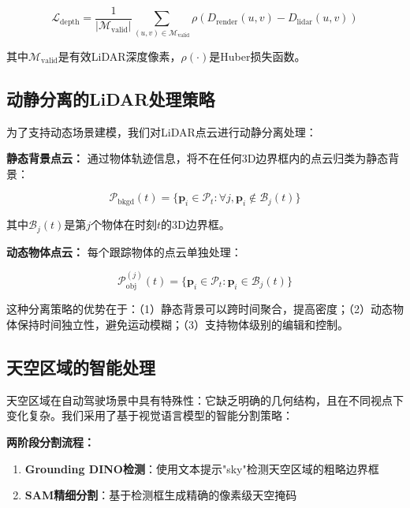 \begin{equation}
\mathcal{L}_{\text{depth}} = \frac{1}{|\mathcal{M}_{\text{valid}}|} \sum_{(u,v) \in \mathcal{M}_{\text{valid}}} \rho(D_{\text{render}}(u,v) - D_{\text{lidar}}(u,v))
\label{eq:depth_supervision}
\end{equation}

其中$\mathcal{M}_{\text{valid}}$是有效LiDAR深度像素，$\rho(\cdot)$是Huber损失函数。

\subsection{动静分离的LiDAR处理策略}

为了支持动态场景建模，我们对LiDAR点云进行动静分离处理：

\textbf{静态背景点云：}
通过物体轨迹信息，将不在任何3D边界框内的点云归类为静态背景：

\begin{equation}
\mathcal{P}_{\text{bkgd}}(t) = \{\mathbf{p}_i \in \mathcal{P}_t : \forall j, \mathbf{p}_i \notin \mathcal{B}_j(t)\}
\label{eq:background_points}
\end{equation}

其中$\mathcal{B}_j(t)$是第$j$个物体在时刻$t$的3D边界框。

\textbf{动态物体点云：}
每个跟踪物体的点云单独处理：

\begin{equation}
\mathcal{P}_{\text{obj}}^{(j)}(t) = \{\mathbf{p}_i \in \mathcal{P}_t : \mathbf{p}_i \in \mathcal{B}_j(t)\}
\label{eq:object_points}
\end{equation}

这种分离策略的优势在于：（1）静态背景可以跨时间聚合，提高密度；（2）动态物体保持时间独立性，避免运动模糊；（3）支持物体级别的编辑和控制。

\subsection{天空区域的智能处理}

天空区域在自动驾驶场景中具有特殊性：它缺乏明确的几何结构，且在不同视点下变化复杂。我们采用了基于视觉语言模型的智能分割策略：

\textbf{两阶段分割流程：}
\begin{enumerate}
\item \textbf{Grounding DINO检测}：使用文本提示"sky"检测天空区域的粗略边界框
\item \textbf{SAM精细分割}：基于检测框生成精确的像素级天空掩码
\end{enumerate}

